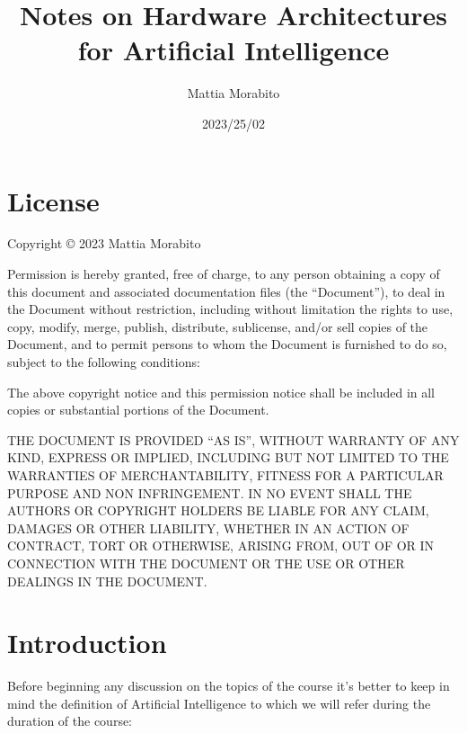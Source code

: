 \documentclass{article}
\title{Notes on Hardware Architectures for Artificial Intelligence}
\date{2023/25/02}
\author{Mattia Morabito}
\begin{document}
  \maketitle

  \newpage

  \begin{frame}{\contentsname}
    \begin{multicols}{2}
    \tableofcontents
    \end{multicols}
    \end{frame}
  \newpage


  \section{License}
    Copyright © 2023 Mattia Morabito


    Permission is hereby granted, free of charge, to any person obtaining a copy of this document and associated documentation files (the “Document”),
    to deal in the Document without restriction, including without limitation the rights to use, copy, modify, merge, publish, distribute, sublicense,
    and/or sell copies of the Document, and to permit persons to whom the Document is furnished to do so, subject to the following conditions:
    
    The above copyright notice and this permission notice shall be included in all copies or substantial portions of the Document.
    
    THE DOCUMENT IS PROVIDED “AS IS”, WITHOUT WARRANTY OF ANY KIND, EXPRESS OR IMPLIED, INCLUDING BUT NOT LIMITED TO THE WARRANTIES OF MERCHANTABILITY, FITNESS FOR A PARTICULAR PURPOSE AND NON INFRINGEMENT. 
    IN NO EVENT SHALL THE AUTHORS OR COPYRIGHT HOLDERS BE LIABLE FOR ANY CLAIM, DAMAGES OR OTHER LIABILITY, WHETHER IN AN ACTION OF CONTRACT, TORT OR OTHERWISE, ARISING FROM, OUT OF OR IN CONNECTION WITH
    THE DOCUMENT OR THE USE OR OTHER DEALINGS IN THE DOCUMENT.

  \newpage
  
  \section{Introduction}
    Before beginning any discussion on the topics of the course it’s better to keep 
    in mind the definition of Artificial Intelligence to which we will refer during the duration of the course:
\end{document}
